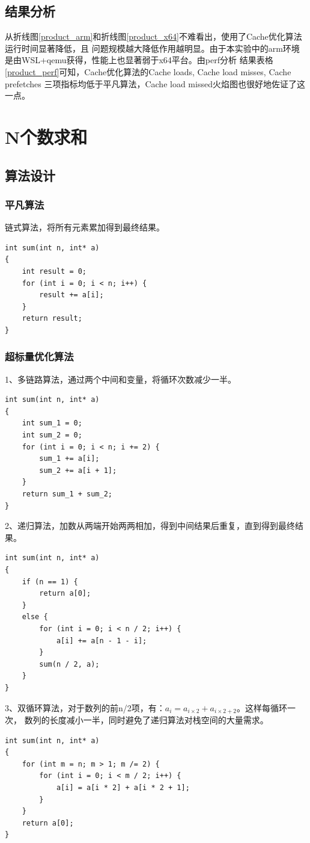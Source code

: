 \documentclass[12pt, a4paper, oneside]{ctexart}
\begin{document}
\subsection{结果分析}
从折线图\ref{product_arm}和折线图\ref{product_x64}不难看出，使用了Cache优化算法运行时间显著降低，且
问题规模越大降低作用越明显。由于本实验中的arm环境是由WSL+qemu获得，性能上也显著弱于x64平台。由perf分析
结果表格\ref{product_perf}可知，Cache优化算法的Cache loads, Cache load misses, Cache prefetches
三项指标均低于平凡算法，Cache load missed火焰图也很好地佐证了这一点。

\section{N个数求和}
\subsection{算法设计}
\subsubsection{平凡算法}
链式算法，将所有元素累加得到最终结果。
\begin{lstlisting}
int sum(int n, int* a)
{
    int result = 0;
    for (int i = 0; i < n; i++) {
        result += a[i];
    }
    return result;
}
\end{lstlisting}
\subsubsection{超标量优化算法}
1、多链路算法，通过两个中间和变量，将循环次数减少一半。
\begin{lstlisting}
int sum(int n, int* a)
{
    int sum_1 = 0;
    int sum_2 = 0;
    for (int i = 0; i < n; i += 2) {
        sum_1 += a[i];
        sum_2 += a[i + 1];
    }
    return sum_1 + sum_2;
}
\end{lstlisting}
2、递归算法，加数从两端开始两两相加，得到中间结果后重复，直到得到最终结果。
\begin{lstlisting}
int sum(int n, int* a)
{
    if (n == 1) {
        return a[0];
    }
    else {
        for (int i = 0; i < n / 2; i++) {
            a[i] += a[n - 1 - i];
        }
        sum(n / 2, a);
    }
}
\end{lstlisting}
3、双循环算法，对于数列的前n/2项，有：$a_i = a_{i \times 2} + a_{i \times 2 + 2}$。这样每循环一次，
数列的长度减小一半，同时避免了递归算法对栈空间的大量需求。
\begin{lstlisting}
int sum(int n, int* a)
{
    for (int m = n; m > 1; m /= 2) {
        for (int i = 0; i < m / 2; i++) {
            a[i] = a[i * 2] + a[i * 2 + 1];
        }
    }
    return a[0];
}
\end{lstlisting}
\end{document}
